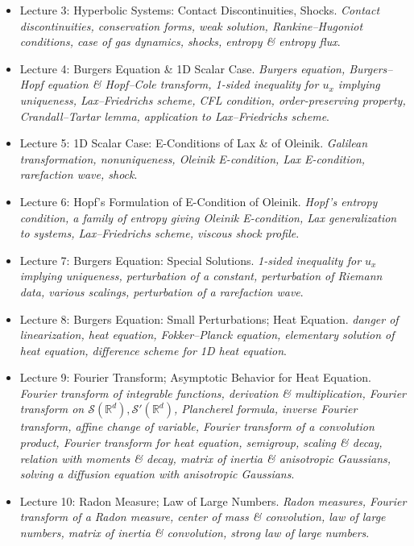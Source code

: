 \documentclass{article}
\begin{document}
\begin{enumerate}
\begin{itemize}
		\item {\sf Lecture 3: Hyperbolic Systems: Contact Discontinuities, Shocks.} {\it Contact discontinuities, conservation forms, weak solution, Rankine--Hugoniot conditions, case of gas dynamics, shocks, entropy \& entropy flux}.
		
		\item {\sf Lecture 4: Burgers Equation \& 1D Scalar Case.} {\it Burgers equation, Burgers--Hopf equation \& Hopf--Cole transform, 1-sided inequality for $u_x$ implying uniqueness, Lax--Friedrichs scheme, CFL condition, order-preserving property, Crandall--Tartar lemma, application to Lax--Friedrichs scheme}.
		
		\item {\sf Lecture 5: 1D Scalar Case: E-Conditions of {\sc Lax} \& of {\sc Oleinik}.} {\it Galilean transformation, nonuniqueness, {\sc Oleinik} E-condition, Lax E-condition, rarefaction wave, shock}.
		
		\item {\sf Lecture 6: {\sc Hopf}'s Formulation of E-Condition of {\sc Oleinik}.} {\it{\sc Hopf}'s entropy condition, a family of entropy giving {\sc Oleinik} E-condition, Lax generalization to systems, Lax--Friedrichs scheme, viscous shock profile}.
		
		\item {\sf Lecture 7: Burgers Equation: Special Solutions.} {\it1-sided inequality for $u_x$ implying uniqueness, perturbation of a constant, perturbation of Riemann data, various scalings, perturbation of a rarefaction wave}.
		
		\item {\sf Lecture 8: Burgers Equation: Small Perturbations; Heat Equation.} {\it danger of linearization, heat equation, Fokker--Planck equation, elementary solution of heat equation, difference scheme for 1D heat equation}.
		
		\item {\sf Lecture 9: Fourier Transform; Asymptotic Behavior for Heat Equation.} {\it Fourier transform of integrable functions, derivation \& multiplication, Fourier transform on $\mathcal{S}(\mathbb{R}^d),\mathcal{S}'(\mathbb{R}^d)$, Plancherel formula, inverse Fourier transform, affine change of variable, Fourier transform of a convolution product, Fourier transform for heat equation, semigroup, scaling \& decay, relation with moments \& decay, matrix of inertia \& anisotropic Gaussians, solving a diffusion equation with anisotropic Gaussians}.
		
		\item {\sf Lecture 10: Radon Measure; Law of Large Numbers.} {\it Radon measures, Fourier transform of a Radon measure, center of mass \& convolution, law of large numbers, matrix of inertia \& convolution, strong law of large numbers}.
		

\end{itemize}
\end{enumerate}
\end{document}
